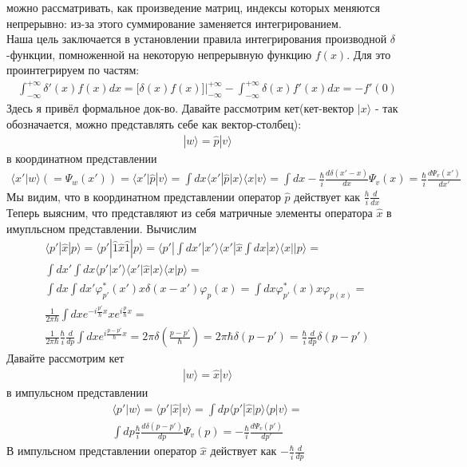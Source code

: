 \documentclass[__main__.tex]{subfiles}
\begin{document}
можно рассматривать, как произведение матриц, индексы которых меняются непрерывно: из-за этого суммирование заменяется интегрированием.\\
Наша цель заключается в установлении правила интегрирования производной $\delta$-функции, помноженной на некоторую непрерывную функцию $f(x)$. Для это проинтегрируем по частям:
\begin{gather*}
\int_{-\infty}^{+\infty}{\delta'(x)f(x)dx} = \big[\delta(x)f(x)\big]\bigg|_{-\infty}^{+\infty} - \int_{-\infty}^{+\infty}{\delta(x)f'(x)dx} = -f'(0)
\end{gather*}
Здесь я привёл формальное док-во. Давайте рассмотрим кет(кет-вектор $|x\rangle$ - так обозначается, можно представлять себе как вектор-столбец):
\begin{gather*}
|w\rangle = \widehat{p}|v\rangle
\end{gather*}
в координатном представлении
\begin{gather*}
\langle x'|w\rangle (=\Psi_w(x')) = \langle x'|\widehat{p}|v\rangle = \int{dx}\langle x'|\widehat{p}|x\rangle\langle x|v\rangle = \int{dx} - \frac{\hbar}{i}\frac{d\delta(x' - x)}{dx}\Psi_v(x) = \frac{\hbar}{i}\frac{d\Psi_v(x')}{dx'}
\end{gather*}
Мы видим, что в координатном представлении оператор $\widehat{p}$ действует как $\frac{h}{i}\frac{d}{dx}$ \\
Теперь выясним, что представляют из себя матричные элементы оператора $\widehat{x}$ в имупльсном представлении. Вычислим
\begin{gather*}
\langle p'|\widehat{x}|p\rangle = \langle p'|\widehat{1}\widehat{x}\widehat{1}|p\rangle = \langle p'|\int{dx'}|x'\rangle\langle x'|\widehat{x}\int{dx}|x\rangle\langle x||p\rangle = \\
\int{dx'}\int{dx}\langle p'|x'\rangle\langle x'|\widehat{x}|x\rangle\langle x|p\rangle = \\
\int{dx}\int{dx'}\varphi_{p'}^{*}(x')x\delta(x - x')\varphi_{p}(x) = \int{dx}\varphi_{p'}^{*}(x)x\varphi_{p(x)} =\\
\frac{1}{2\pi\hbar}\int{dx}e^{-i\frac{p'}{\hbar}x}xe^{i\frac{p}{\hbar}x} =\\
\frac{1}{2\pi\hbar}\frac{\hbar}{i}\frac{d}{dp}\int{dx}e^{i\frac{p - p'}{\hbar}x} = 2\pi\delta(\frac{p - p'}{\hbar}) = 2\pi\hbar\delta(p - p') = \frac{\hbar}{i}\frac{d}{dp}\delta(p - p')
\end{gather*}
Давайте рассмотрим кет 
\begin{gather*}
|w\rangle = \widehat{x}|v\rangle
\end{gather*}
в импульсном представлении
\begin{gather*}
\langle p'|w\rangle = \langle p'|\widehat{x}|v\rangle = \int{dp}\langle p'|\widehat{x}|p\rangle\langle p|v\rangle =\\ \int{dp}\frac{\hbar}{i}\frac{d\delta(p - p')}{dp}\Psi_{v}(p) = -\frac{\hbar}{i}\frac{d\Psi_{v}(p')}{dp'}
\end{gather*}
В импульсном представлении оператор $\widehat{x}$ действует как $-\frac{\hbar}{i}\frac{d}{dp}$
\end{document}
